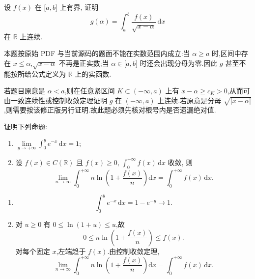 \begin{example}[\markstar]
    设 $f(x)$ 在 $\lbrack a,b\rbrack$ 上有界, 证明
    \[
        g(\alpha)=\int_a^b\dfrac{f(x)}{\sqrt{x-\alpha}}\,\mathrm{d}x
    \]
    在 $\mathbb{R}$ 上连续.
\end{example}
\exampleblank

\begin{solution}
    本题按原始 PDF 与当前源码的题面不能在实数范围内成立:当 $\alpha\geq a$ 时,区间中存在 $x\leq\alpha$,$\sqrt{x-\alpha}$ 不再是正实数;当 $\alpha\in\lbrack a,b\rbrack$ 时还会出现分母为零.因此 $g$ 甚至不能按所给公式定义为 $\mathbb{R}$ 上的实函数.

    若题目原意是 $\alpha<a$,则在任意紧区间 $K\subset(-\infty,a)$ 上有
    $x-\alpha\geq c_K>0$,从而可由一致连续性或控制收敛定理证明 $g$ 在 $(-\infty,a)$ 上连续.若原意是分母 $\sqrt{|x-\alpha|}$,则需要按该修正版另行证明.故此题必须先核对根号内是否遗漏绝对值.
\end{solution}

\begin{example}
    证明下列命题:
    \begin{enumerate}
        \item $\displaystyle \lim\limits_{y\to+\infty}\int_0^y e^{-x}\,\mathrm{d}x=1$;
        \item 设 $f(x)\in C(\mathbb{R})$ 且 $f(x)\geq0$, $\displaystyle\int_0^{+\infty}f(x)\,\mathrm{d}x$ 收敛, 则
              \[
                  \lim\limits_{n\to\infty}\int_0^{+\infty}n\ln\left(1+\dfrac{f(x)}{n}\right)\mathrm{d}x
                  =\int_0^{+\infty}f(x)\,\mathrm{d}x.
              \]
    \end{enumerate}
\end{example}
\exampleblank

\begin{solution}
    \begin{enumerate}
        \item
              \[
                  \int_0^y e^{-x}\,\mathrm{d}x=1-e^{-y}\longrightarrow1.
              \]
        \item 对 $u\geq0$ 有 $0\leq\ln(1+u)\leq u$,故
              \[
                  0\leq n\ln\left(1+\dfrac{f(x)}{n}\right)\leq f(x).
              \]
              对每个固定 $x$,左端趋于 $f(x)$.由控制收敛定理,
              \[
                  \lim\limits_{n\to\infty}\int_0^{+\infty}n\ln\left(1+\dfrac{f(x)}{n}\right)\mathrm{d}x
                  =\int_0^{+\infty}f(x)\,\mathrm{d}x.
              \]
    \end{enumerate}
\end{solution}

